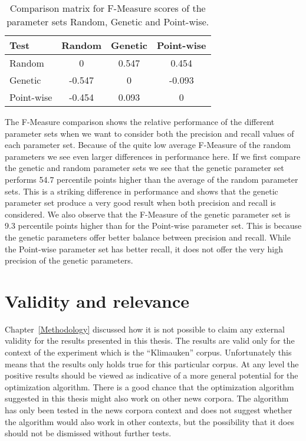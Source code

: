 \begin{table}[H]
\begin{center}
\begin{tabular}{|l|ccc|}
\hline
Test & 			Random 	& 	Genetic 	& Point-wise\\ 
\hline
Random 		&  	  0 	& 	0.547		&  0.454\\ 
Genetic 	&   -0.547 	&      0  		&  -0.093\\ 
Point-wise 	&   -0.454 	&    0.093 		&  0  \\ 
\hline
\end{tabular}
\end{center}
\caption{Comparison matrix for F-Measure scores of the parameter sets Random, Genetic and Point-wise.}
\label{tab:summaryfmeasuretableresults}
\end{table}

The F-Measure comparison shows the relative performance of the different parameter sets when we want to consider both the precision and recall values of each parameter set. Because of the quite low average F-Measure of the random parameters we see even larger differences in performance here. If we first compare the genetic and random parameter sets we see that the genetic parameter set performs 54.7 percentile points higher than the average of the random parameter sets. This is a striking difference in performance and shows that the genetic parameter set produce a very good result when both precision and recall is considered. We also observe that the F-Measure of the genetic parameter set is 9.3 percentile points higher than for the Point-wise parameter set. This is because the genetic parameters offer better balance between precision and recall. While the Point-wise parameter set has better recall, it does not offer the very high precision of the genetic parameters.


\section{Validity and relevance}
\label{ValidityRelevance}
Chapter~\ref{Methodology} discussed how it is not possible to claim any external validity for the results presented in this thesis. The results are valid only for the context of the experiment which is the ``Klimauken'' corpus. Unfortunately this means that the results only holds true for this particular corpus. At any level the positive results should be viewed as indicative of a more general potential for the optimization algorithm. There is a good chance that the optimization algorithm suggested in this thesis might also work on other news corpora. The algorithm has only been tested in the news corpora context and does not suggest whether the algorithm would also work in other contexts, but the possibility that it does should not be dismissed without further tests.

